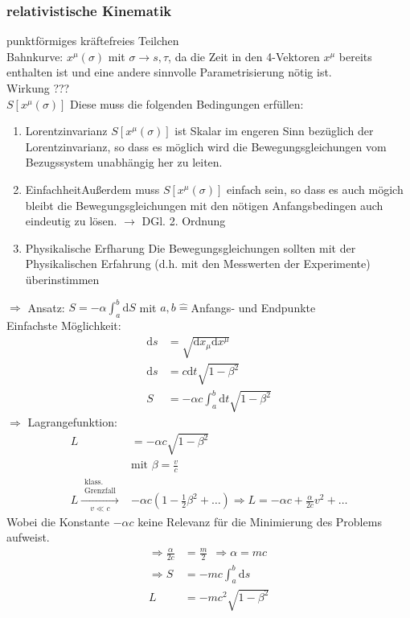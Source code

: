 \documentclass[a4paper]{article}
\begin{document}
\subsubsection{relativistische Kinematik}
punktförmiges kräftefreies Teilchen\\
Bahnkurve: $x^\mu(\sigma)$ mit $\sigma \rightarrow s,\tau$, da die Zeit in den
4-Vektoren $x^\mu$ bereits enthalten ist und eine andere sinnvolle
Parametrisierung nötig ist.\\
Wirkung ???\\
$S[x^\mu(\sigma)]$ 
Diese muss die folgenden Bedingungen erfüllen:
\begin{enumerate}
  \item{Lorentzinvarianz} $S[x^\mu(\sigma)]$ ist Skalar im engeren Sinn
   bezüglich der Lorentzinvarianz, so dass es möglich wird die
   Bewegungsgleichungen vom Bezugssystem unabhängig her zu leiten.
  \item{Einfachheit}Außerdem muss $S[x^\mu(\sigma)]$ einfach
   sein, so dass es auch mögich bleibt die Bewegungsgleichungen mit den nötigen
   Anfangsbedingen auch eindeutig zu lösen. $\rightarrow$ DGl. 2. Ordnung
  \item{Physikalische Erfharung} Die Bewegungsgleichungen sollten mit der
  Physikalischen Erfahrung (d.h. mit den Messwerten der Experimente)
  überinstimmen
\end{enumerate}
$\Rightarrow$ Ansatz: $S=-\alpha\int_a^b \mathrm{d}S$ mit $a,b\hat{=}$Anfangs- und
Endpunkte\\
Einfachste Möglichkeit: 
\begin{align}
\mathrm{d}s&=\sqrt{\mathrm{d}x_\mu \mathrm{d}x^\mu}\\
\mathrm{d}s&=c\mathrm{d}t\sqrt{1-\beta^2}\\
S&=-\alpha c \int_a^b \mathrm{d}t \sqrt{1-\beta^2}
\end{align}
$\Rightarrow$ Lagrangefunktion: 
\begin{align} 
L&=-\alpha c \sqrt{1-\beta^2} \\
&\text{mit }\beta=\frac{v}{c}\\
L \overset{\substack{\text{klass.}\\
\text{Grenzfall}}}{\underset{{v \ll c}}{\longrightarrow}}& 
-\alpha c \left(1-\frac{1}{2}\beta^2+\ldots\right) \Rightarrow L=-\alpha c +
\frac{\alpha}{2 c} v^2 + \ldots
\end{align}
Wobei die Konstante $-\alpha c$ keine Relevanz für die Minimierung des Problems
aufweist.
\begin{align}
\Rightarrow \frac{\alpha}{2 c}&=\frac{m}{2} \ \ \Rightarrow \alpha=m c \\
\Rightarrow S&=-mc\int^b_a \mathrm{d}s \\
L&=-mc^2\sqrt{1-\beta^2}
\end{align}
\end{document}
